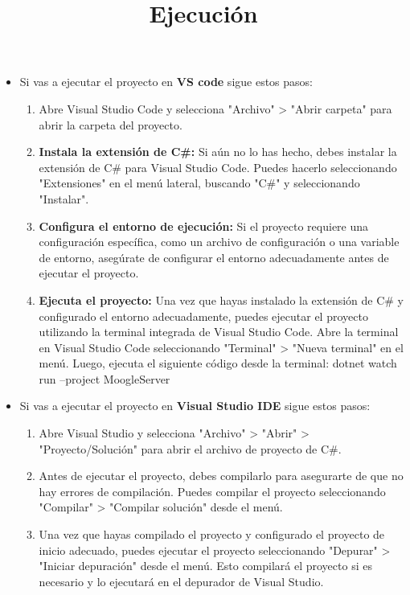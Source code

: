 \documentclass{article}
\begin{document}
    \normalsize
\title{\textbf{Ejecución}}
    \begin{itemize}
        \item Si vas a ejecutar el proyecto en \textbf{VS code} sigue estos pasos:
        \begin{enumerate}
            \item Abre Visual Studio Code y selecciona "Archivo" > "Abrir carpeta" para abrir la carpeta del
            proyecto.
            \item \textbf{Instala la extensión de C\#:} Si aún no lo has hecho, debes instalar la extensión de C\# para Visual
            Studio Code. Puedes hacerlo seleccionando "Extensiones" en el menú lateral, buscando "C\#" y
            seleccionando "Instalar".
            \item \textbf{Configura el entorno de ejecución:} Si el proyecto requiere una configuración específica, como un
            archivo de configuración o una variable de entorno, asegúrate de configurar el entorno
            adecuadamente antes de ejecutar el proyecto. 
            \item \textbf{Ejecuta el proyecto:}  Una vez que hayas instalado la extensión de C\# y configurado el entorno
            adecuadamente, puedes ejecutar el proyecto utilizando la terminal integrada de Visual Studio Code.
            Abre la terminal en Visual Studio Code seleccionando "Terminal" > "Nueva terminal" en el menú.
            Luego, ejecuta el siguiente código desde la terminal: dotnet watch run --project MoogleServer
        \end{enumerate}
        \item Si vas a ejecutar el proyecto en \textbf{Visual Studio IDE} sigue estos pasos:
        \begin{enumerate}
            \item Abre Visual Studio y selecciona "Archivo" > "Abrir" > "Proyecto/Solución" para abrir el
            archivo de proyecto de C\#.
            \item Antes de ejecutar el proyecto, debes compilarlo para asegurarte de que no hay errores de
            compilación. Puedes compilar el proyecto seleccionando "Compilar" > "Compilar solución"
            desde el menú.
            \item Una vez que hayas compilado el proyecto y configurado el proyecto de inicio adecuado, puedes
            ejecutar el proyecto seleccionando "Depurar" > "Iniciar depuración" desde el menú. Esto
            compilará el proyecto si es necesario y lo ejecutará en el depurador de Visual Studio.
        \end{enumerate}
    \end{itemize}
\end{document}
